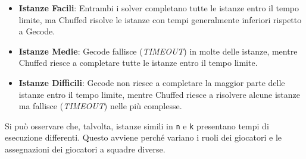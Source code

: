 \documentclass{article}
\begin{document}
\begin{multicols*}{2}
\begin{itemize}
    \item \textbf{Istanze Facili}: Entrambi i solver completano tutte le istanze entro il tempo limite, ma Chuffed risolve le istanze con tempi generalmente inferiori rispetto a Gecode.
    \item \textbf{Istanze Medie}: Gecode fallisce (\textit{TIMEOUT}) in molte delle istanze, mentre Chuffed riesce a completare tutte le istanze entro il tempo limite.
    \item \textbf{Istanze Difficili}: Gecode non riesce a completare la maggior parte delle istanze entro il tempo limite, mentre Chuffed riesce a risolvere alcune istanze ma fallisce (\textit{TIMEOUT}) nelle più complesse.
\end{itemize}
Si può osservare che, talvolta, istanze simili in \texttt{n} e \texttt{k} presentano tempi di esecuzione differenti. Questo avviene perché variano i ruoli dei giocatori e le assegnazioni dei giocatori a squadre diverse.


\end{multicols*}
\end{document}
